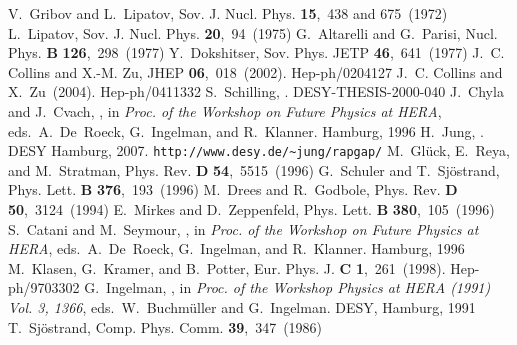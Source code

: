 \documentclass[10pt]{article} \usepackage{dina4}
\begin{document}
\begin{mcbibliography}{10}
\relax
{}
V.~Gribov and L.~Lipatov,
\newblock Sov. J. Nucl. Phys.{} {\bf 15},~438 and 675~(1972)\relax
\relax
{}
L.~Lipatov,
\newblock Sov. J. Nucl. Phys.{} {\bf 20},~94~(1975)\relax
\relax
{}
G.~Altarelli and G.~Parisi,
\newblock Nucl. Phys. {\bf B}{} {\bf 126},~298~(1977)\relax
\relax
{}
Y.~Dokshitser,
\newblock Sov. Phys. JETP{} {\bf 46},~641~(1977)\relax
\relax
{}
J.~C. Collins and X.-M. Zu,
\newblock JHEP{} {\bf 06},~018~(2002).
\newblock Hep-ph/0204127\relax
\relax
{}
J.~C. Collins and X.~Zu~(2004).
\newblock Hep-ph/0411332\relax
\relax
{}
S.~Schilling,
.
\newblock DESY-THESIS-2000-040\relax
\relax
{}
J.~Chyla and J.~Cvach,
,
\newblock in {\em Proc. of the Workshop on Future Physics at HERA},
  eds.~A.~\mbox{De Roeck}, G.~Ingelman, and R.~Klanner.
\newblock Hamburg, 1996\relax
\relax
{}
H.~Jung,
.
\newblock DESY Hamburg, 2007.
\newblock \verb+http://www.desy.de/~jung/rapgap/+\relax
\relax
{}
M.~Gl\"uck, E.~Reya, and M.~Stratman,
\newblock Phys. Rev. {\bf D}{} {\bf 54},~5515~(1996)\relax
\relax
{}
G.~Schuler and T.~Sj\"ostrand,
\newblock Phys. Lett. {\bf B}{} {\bf 376},~193~(1996)\relax
\relax
{}
M.~Drees and R.~Godbole,
\newblock Phys. Rev. {\bf D}{} {\bf 50},~3124~(1994)\relax
\relax
{}
E.~Mirkes and D.~Zeppenfeld,
\newblock Phys. Lett. {\bf B}{} {\bf 380},~105~(1996)\relax
\relax
{}
S.~Catani and M.~Seymour,
,
\newblock in {\em Proc. of the Workshop on Future Physics at HERA},
  eds.~A.~\mbox{De Roeck}, G.~Ingelman, and R.~Klanner.
\newblock Hamburg, 1996\relax
\relax
{}
M.~Klasen, G.~Kramer, and B.~Potter,
\newblock Eur. Phys. J. {\bf C}{} {\bf 1},~261~(1998).
\newblock Hep-ph/9703302\relax
\relax
{}
G.~Ingelman,
,
\newblock in {\em Proc. of the Workshop Physics at HERA (1991) Vol. 3, 1366},
  eds.~W.~Buchm\"uller and G.~Ingelman.
\newblock \mbox{DESY}, Hamburg, 1991\relax
\relax
{}
T.~Sj\"ostrand,
\newblock Comp. Phys. Comm.{} {\bf 39},~347~(1986)\relax

\end{mcbibliography}
\end{document}
